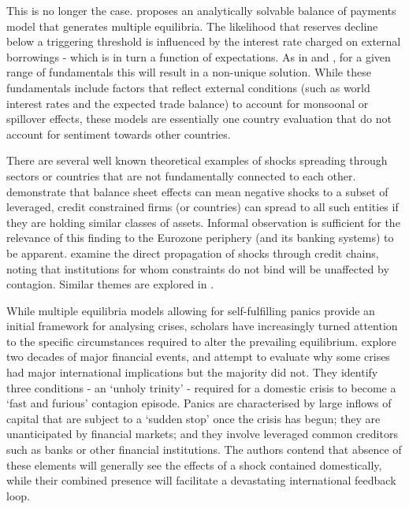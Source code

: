 \documentclass[../base.tex]{subfiles}
\begin{document}
This is no longer the case. \cite{masson1999contagion} proposes an analytically solvable balance of payments model that generates multiple equilibria. The likelihood that reserves decline below a triggering threshold is influenced by the interest rate charged on external borrowings - which is in turn a function of expectations. As in \cite{obstfeld1996models} and \cite{jeanne1997currency}, for a given range of fundamentals this will result in a non-unique solution. While these fundamentals include factors that reflect external conditions (such as world interest rates and the expected trade balance) to account for monsoonal or spillover effects, these models are essentially one country evaluation that do not account for sentiment towards other countries. 

There are several well known theoretical examples of shocks spreading through sectors or countries that are not fundamentally connected to each other. \cite{kiyotaki2002balance} demonstrate that balance sheet effects can mean negative shocks to a subset of leveraged, credit constrained firms (or countries) can spread to all such entities if they are holding similar classes of assets. Informal observation is sufficient for the relevance of this finding to the Eurozone periphery (and its banking systems) to be apparent. \cite{kiyotaki1997credit} examine the direct propagation of shocks through credit chains, noting that institutions for whom constraints do not bind will be unaffected by contagion. Similar themes are explored in \cite{rochet1996interbank}.

While multiple equilibria models allowing for self-fulfilling panics provide an initial framework for analysing crises, scholars have increasingly turned attention to the specific circumstances required to alter the prevailing equilibrium. \cite{kaminsky2003unholy} explore two decades of major financial events, and attempt to evaluate why some crises had major international implications but the majority did not. They identify three conditions - an `unholy trinity' - required for a domestic crisis to become a `fast and furious' contagion episode. Panics are characterised by large inflows of capital that are subject to a `sudden stop' once the crisis has begun; they are unanticipated by financial markets; and they involve leveraged common creditors such as banks or other financial institutions. The authors contend that absence of these elements will generally see the effects of a shock contained domestically, while their combined presence will facilitate a devastating international feedback loop. 
\end{document}

